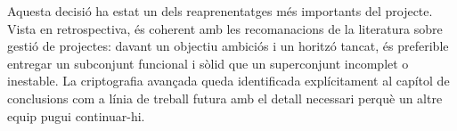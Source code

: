 Aquesta decisió ha estat un dels reaprenentatges més importants del
projecte. Vista en retrospectiva, és coherent amb les recomanacions de la
literatura sobre gestió de projectes: davant un objectiu ambiciós i un
horitzó tancat, és preferible entregar un subconjunt funcional i sòlid que
un superconjunt incomplet o inestable. La criptografia avançada queda
identificada explícitament al capítol de conclusions com a línia de treball
futura amb el detall necessari perquè un altre equip pugui continuar-hi.
